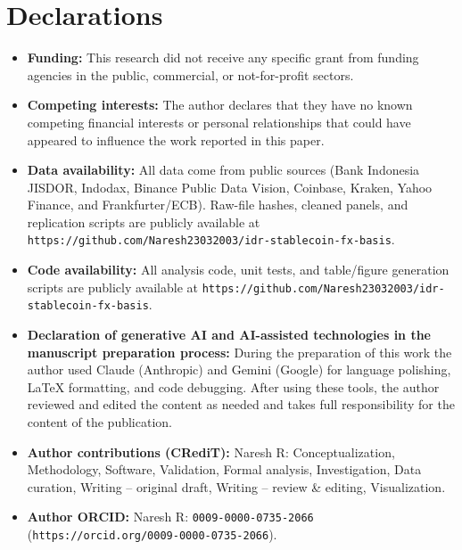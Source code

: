 \documentclass[pdflatex,sn-basic]{sn-jnl}
\begin{document}









\begin{appendices}


\end{appendices}

\clearpage
\section*{Declarations}
\begingroup\sloppy

\begin{itemize}
\item \textbf{Funding:} This research did not receive any specific grant from funding agencies in the public, commercial, or not-for-profit sectors.
\item \textbf{Competing interests:} The author declares that they have no known competing financial interests or personal relationships that could have appeared to influence the work reported in this paper.
\item \textbf{Data availability:} All data come from public sources (Bank Indonesia JISDOR, Indodax, Binance Public Data Vision, Coinbase, Kraken, Yahoo Finance, and Frankfurter/ECB). Raw-file hashes, cleaned panels, and replication scripts are publicly available at \texttt{https://github.com/Naresh23032003/idr-stablecoin-fx-basis}.
\item \textbf{Code availability:} All analysis code, unit tests, and table/figure generation scripts are publicly available at \texttt{https://github.com/Naresh23032003/idr-stablecoin-fx-basis}.
\item \textbf{Declaration of generative AI and AI-assisted technologies in the manuscript preparation process:} During the preparation of this work the author used Claude (Anthropic) and Gemini (Google) for language polishing, \LaTeX{} formatting, and code debugging. After using these tools, the author reviewed and edited the content as needed and takes full responsibility for the content of the publication.
\item \textbf{Author contributions (CRediT):} Naresh R: Conceptualization, Methodology, Software, Validation, Formal analysis, Investigation, Data curation, Writing -- original draft, Writing -- review \& editing, Visualization.
\item \textbf{Author ORCID:} Naresh R: \texttt{0009-0000-0735-2066} (\texttt{https://orcid.org/0009-0000-0735-2066}).
\end{itemize}
\endgroup

{\sloppy}
\end{document}
